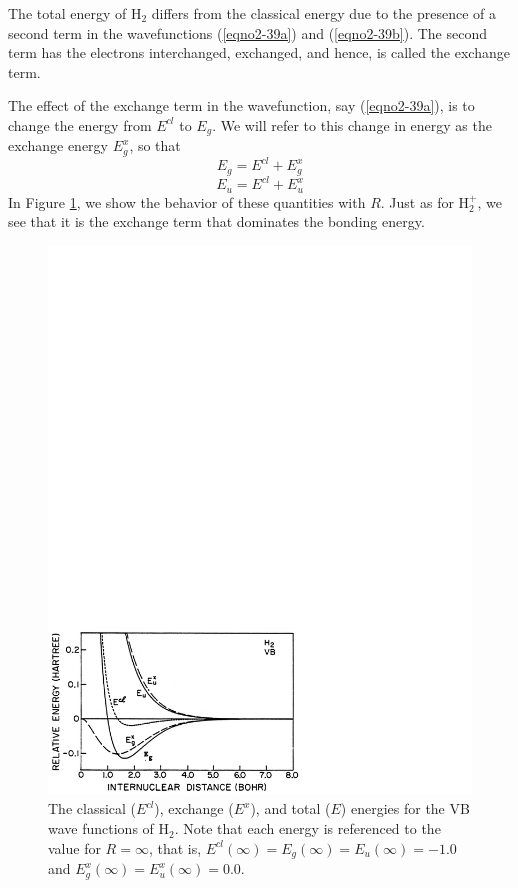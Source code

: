 The total energy of H$_2$ differs from the classical energy due to the
presence of a second term in the wavefunctions (\ref{eqno2-39a}) and
(\ref{eqno2-39b}). The second term has the electrons interchanged,
exchanged, and hence, is called the exchange term.
    
The effect of the exchange term in the wavefunction, say
(\ref{eqno2-39a}), is to change the energy from $E^{cl}$ to $E_g$.  We
will refer to this change in energy as the exchange energy $E^x_g$, so
that
\begin{equation}
E_g = E^{cl} + E^x_g
\end{equation}
\begin{equation}
E_u = E^{cl} + E_u^x
\end{equation}
In Figure \ref{fig2-30}, we show the behavior of these quantities with
$R$.  Just as for H$^+_2$, we see that it is the exchange term that
dominates the bonding energy.

\begin{figure}
\includegraphics[scale=0.75]{fig2-30}
\caption{The classical ($E^{cl}$), exchange ($E^x$), and total ($E$)
  energies for the VB wave functions of H$_2$. Note that each energy
  is referenced to the value for $R = \infty$, that is,
  $E^{cl}(\infty) = E_g(\infty) = E_u(\infty) = -1.0$ and
  $E_g^x(\infty) = E_u^x(\infty) = 0.0$.}
\label{fig2-30}
\end{figure}

